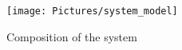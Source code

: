 \begin{figure}[tb]
\centering
\texttt{[image: Pictures/system\_model]}
\caption{Composition of the system}
\label{fig:system_model}
\end{figure}